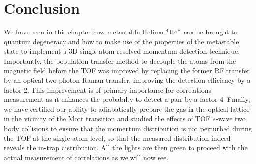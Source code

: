 \section{Conclusion}

We have seen in this chapter how metastable Helium $^4 \mathrm{He}^*$ can be brought to quantum degeneracy and how to make use of the properties of the metastable state to implement a 3D single atom resolved momentum detection technique. Importantly, the population transfer method to decouple the atoms from the magnetic field before the TOF was improved by replacing the former RF transfer by an optical two-photon Raman transfer, improving the detection efficiency by a factor 2. This improvement is of primary importance for \kmk correlations measurement as it enhances the probabilty to detect a \kmk pair by a factor 4. Finally, we have certified our ability to adiabatically prepare the gas in the optical lattice in the vicinity of the Mott transition and studied the effects of TOF $s$-wave two body collisions to ensure that the momentum distribution is not perturbed during the TOF at the single atom level, so that the measured distribution indeed reveals the in-trap distribution. All the lights are then green to proceed with the actual measurement of \kmk correlations as we will now see.




